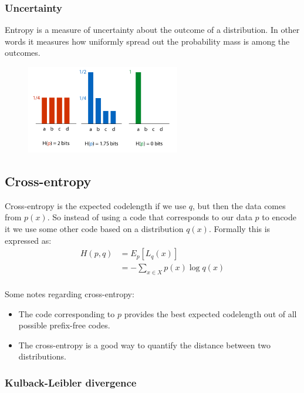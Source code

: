 \documentclass[12pt]{article}
\begin{document}
\subsubsection*{Uncertainty}

Entropy is a measure of uncertainty about the outcome of a distribution. In other words it measures how uniformly spread out the probability mass is among the outcomes.

\begin{figure}[!h]
    \centering
    \includegraphics[width=0.6\textwidth]{assets/entropy.png}
\end{figure}

\subsection{Cross-entropy}

\begin{definition}
    Cross-entropy is the expected codelength if we use $q$, but then the data comes from $p(x)$. So instead of using a code that corresponds to our data $p$ to encode it we use some other code based on a distribution $q(x)$. Formally this is expressed as:
    \begin{align*}
        H(p, q) & = E_p[L_q(x)] \\
        & = -\sum_{x\in X} p(x)\log q(x) \\        
    \end{align*}
\end{definition}

Some notes regarding cross-entropy:
\begin{itemize}[leftmargin=*, noitemsep]
    \item The code corresponding to $p$ provides the best expected codelength out of all possible prefix-free codes.
    \item The cross-entropy is a good way to quantify the distance between two distributions.
\end{itemize}

\subsubsection*{Kulback-Leibler divergence}
\end{document}

